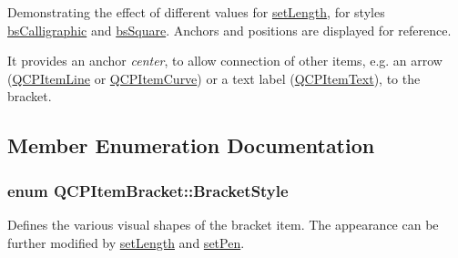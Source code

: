  \begin{center}Demonstrating the effect of different values for \hyperlink{class_q_c_p_item_bracket_ac7cfc3da7da9b5c5ac5dfbe4f0351b2a}{set\+Length}, for styles \hyperlink{class_q_c_p_item_bracket_a7ac3afd0b24a607054e7212047d59dbda0333e35b7183ca344f06435133ca53b5}{bs\+Calligraphic} and \hyperlink{class_q_c_p_item_bracket_a7ac3afd0b24a607054e7212047d59dbda44d78ec5c23946228633281791ec7134}{bs\+Square}. Anchors and positions are displayed for reference.\end{center} 

It provides an anchor {\itshape center}, to allow connection of other items, e.\+g. an arrow (\hyperlink{class_q_c_p_item_line}{Q\+C\+P\+Item\+Line} or \hyperlink{class_q_c_p_item_curve}{Q\+C\+P\+Item\+Curve}) or a text label (\hyperlink{class_q_c_p_item_text}{Q\+C\+P\+Item\+Text}), to the bracket. 

\subsection{Member Enumeration Documentation}
\subsubsection[{\texorpdfstring{Bracket\+Style}{BracketStyle}}]{\setlength{\rightskip}{0pt plus 5cm}enum {\bf Q\+C\+P\+Item\+Bracket\+::\+Bracket\+Style}}\hypertarget{class_q_c_p_item_bracket_a7ac3afd0b24a607054e7212047d59dbd}{}\label{class_q_c_p_item_bracket_a7ac3afd0b24a607054e7212047d59dbd}
Defines the various visual shapes of the bracket item. The appearance can be further modified by \hyperlink{class_q_c_p_item_bracket_ac7cfc3da7da9b5c5ac5dfbe4f0351b2a}{set\+Length} and \hyperlink{class_q_c_p_item_bracket_ab13001d9cc5d8f9e56ea15bdda682acb}{set\+Pen}.

